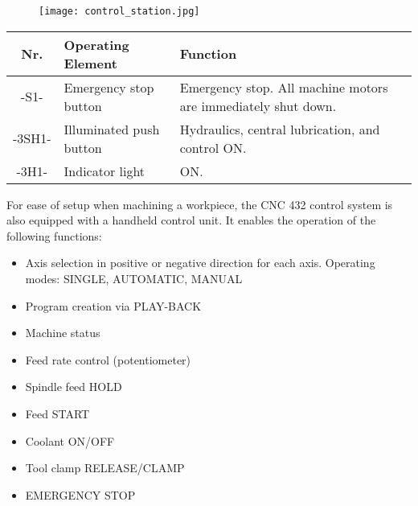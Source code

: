 \begin{figure}[h]
    \centering
    \texttt{[image: control\_station.jpg]} %
\end{figure}


\vspace{0.3cm}

\noindent %
\begin{tabular}{|c|l|p{10cm}|}
    \hline\hline
    \textbf{Nr.} & \textbf{Operating Element} & \textbf{Function} \\
    \hline\hline
    -S1-   & Emergency stop button & Emergency stop. All machine motors are immediately shut down.\footnotemark[11] \\
    \hline
    -3SH1- & Illuminated push button & Hydraulics, central lubrication, and control ON. \\
    -3H1-  & Indicator light & ON. \\
    \hline\hline
\end{tabular}

\vspace{0.5cm}


\setcounter{page}{4}


\noindent
For ease of setup when machining a workpiece, the CNC 432 control system is also equipped with a handheld control unit. It enables the operation of the following functions:

\begin{itemize}[itemsep=1pt,parsep=0pt]
    \item Axis selection in positive or negative direction for each axis. Operating modes: SINGLE, AUTOMATIC, MANUAL
    \item Program creation via PLAY-BACK
    \item Machine status
    \item Feed rate control (potentiometer)
    \item Spindle feed HOLD
    \item Feed START
    \item Coolant ON/OFF
    \item Tool clamp RELEASE/CLAMP
    \item EMERGENCY STOP
\end{itemize}

